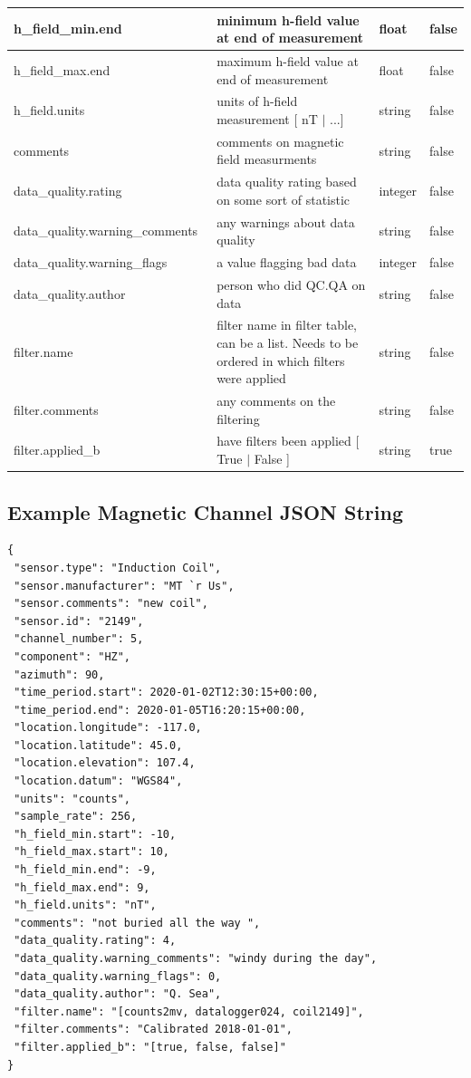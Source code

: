 \documentclass{article}
\begin{document}
\begin{table}[htb!]
\begin{tabular}{|l|p{3in}|l|l|}
        h\_field\_min.end\ & minimum h-field value at end of measurement & float &  false\\ \hline
        h\_field\_max.end\ & maximum h-field value at end of measurement & float &  false\\ \hline
        h\_field.units\ & units of h-field measurement [ nT $|$ ...] & string &   false \\ \hline
        comments\ & comments on magnetic field measurments & string &  false \\ \hline
        data\_quality.rating\ & data quality rating based on some sort of statistic & integer &  false \\ \hline
        data\_quality.warning\_comments\ & any warnings about data quality & string &   false \\ \hline
        data\_quality.warning\_flags\ & a value flagging bad data  & integer &  false \\ \hline
        data\_quality.author\ & person who did QC.QA on data & string &   false \\ \hline
        filter.name\ & filter name in filter table, can be a list. Needs to be ordered in which filters were applied & string &  false \\ \hline
        filter.comments\ & any comments on the filtering & string &  false \\ \hline
        filter.applied\_b & have filters been applied [ True $|$ False ] & string & true \\ \hline
        \end{tabular}
    \label{tab:magnetic}
\end{table}

\newpage
\subsection{Example Magnetic Channel JSON String}

\begin{verbatim}
{
 "sensor.type": "Induction Coil",
 "sensor.manufacturer": "MT `r Us",
 "sensor.comments": "new coil",
 "sensor.id": "2149",
 "channel_number": 5,
 "component": "HZ",
 "azimuth": 90,
 "time_period.start": 2020-01-02T12:30:15+00:00,
 "time_period.end": 2020-01-05T16:20:15+00:00,
 "location.longitude": -117.0,
 "location.latitude": 45.0,
 "location.elevation": 107.4,
 "location.datum": "WGS84",
 "units": "counts",
 "sample_rate": 256,
 "h_field_min.start": -10,
 "h_field_max.start": 10,
 "h_field_min.end": -9,
 "h_field_max.end": 9,
 "h_field.units": "nT",
 "comments": "not buried all the way ",
 "data_quality.rating": 4,
 "data_quality.warning_comments": "windy during the day",
 "data_quality.warning_flags": 0,
 "data_quality.author": "Q. Sea",
 "filter.name": "[counts2mv, datalogger024, coil2149]",
 "filter.comments": "Calibrated 2018-01-01",
 "filter.applied_b": "[true, false, false]"
}
\end{verbatim}
\end{document}
